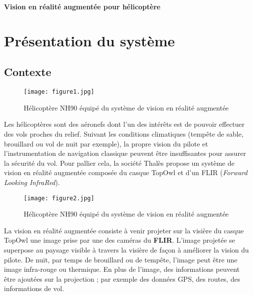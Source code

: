 \begin{huge}
\textbf{Vision en réalité augmentée pour hélicoptère}
\end{huge}

\section*{Présentation du système}

\subsection*{Contexte}
\begin{figure}[h]
\begin{center}
\texttt{[image: figure1.jpg]}
\caption{Hélicoptère NH90 équipé du système de vision en réalité augmentée\label{fig1}}
\end{center}
\end{figure}

Les hélicoptères sont des aéronefs dont l'un des intérêts est de pouvoir effectuer des vols proches du relief. Suivant les conditions climatiques (tempête de sable, brouillard ou vol de nuit par exemple), la propre vision du pilote et l'instrumentation de navigation classique peuvent être insuffisantes pour assurer la sécurité du vol. Pour pallier cela, la société Thalès propose un système de vision en réalité augmentée composée du casque TopOwl et d'un FLIR (\textit{Forward Looking InfraRed}).

\begin{figure}[h]
\centering
\texttt{[image: figure2.jpg]}
\caption{Hélicoptère NH90 équipé du système de vision en réalité augmentée\label{fig2}}
\end{figure}

La vision en réalité augmentée consiste à venir projeter
sur la visière du casque TopOwl une image prise par une
des caméras du \textbf{FLIR}. L'image projetée se superpose au
paysage visible à travers la visière de façon à améliorer
la vision du pilote. De nuit, par temps de brouillard ou
de tempête, l'image peut être une image infra-rouge ou
thermique. En plus de l'image, des informations peuvent être ajoutées sur la projection ; par exemple des données
GPS, des routes, des informations de vol.

